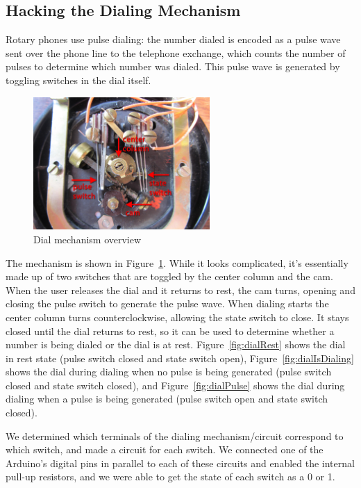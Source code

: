 \documentclass{es50report}
\begin{document}
    \subsection{Hacking the Dialing Mechanism}
    Rotary phones use pulse dialing: the number dialed is encoded as a pulse wave sent over the phone line to the telephone exchange, which counts the number of pulses to determine which number was dialed. This pulse wave is generated by toggling switches in the dial itself.

    \begin{figure}
        \centering
        \includegraphics[width=0.6\textwidth, clip=true, trim=200 50 200 70]{images/small/dialOverview}
        \caption{Dial mechanism overview}\label{fig:dialOverview}
    \end{figure}

    The mechanism is shown in Figure~\ref{fig:dialOverview}. While it looks complicated, it's essentially made up of two switches that are toggled by the center column and the cam. When the user releases the dial and it returns to rest, the cam turns, opening and closing the pulse switch to generate the pulse wave. When dialing starts the center column turns counterclockwise, allowing the state switch to close. It stays closed until the dial returns to rest, so it can be used to determine whether a number is being dialed or the dial is at rest. Figure~\ref{fig:dialRest} shows the dial in rest state (pulse switch closed and state switch open), Figure~\ref{fig:dialIsDialing} shows the dial during dialing when no pulse is being generated (pulse switch closed and state switch closed), and Figure~\ref{fig:dialPulse} shows the dial during dialing when a pulse is being generated (pulse switch open and state switch closed).

    We determined which terminals of the dialing mechanism/circuit correspond to which switch, and made a circuit for each switch. We connected one of the Arduino's digital pins in parallel to each of these circuits and enabled the internal pull-up resistors, and we were able to get the state of each switch as a 0 or 1.
\end{document}
